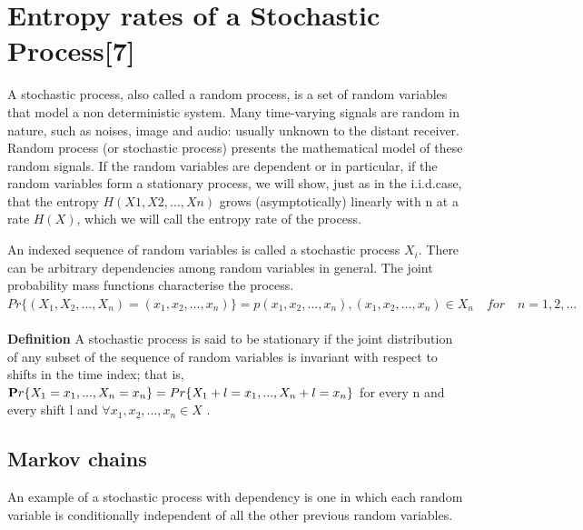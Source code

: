 \documentclass[10pt,twocolumn,letterpaper]{article}
\begin{document}
\section{Entropy rates of a Stochastic Process{\small[7]}}


A stochastic process, also called a random process, is a set of random variables that model a non deterministic system.  Many time-varying signals are random in nature, such as noises, image and audio: usually unknown to the distant receiver. Random process (or stochastic process) presents the mathematical model of these random signals. If the random variables are dependent or in particular, if the random variables form a stationary process, we will show, just as in the i.i.d.case, that the entropy
\begin{math}H (X 1 , X 2 , \dots , X n )\end{math} grows (asymptotically) linearly with n at a rate \begin{math}H ( X )\end{math}, which we will call the entropy rate of the process.

An indexed sequence of random variables is called a stochastic process
\begin{math}
{X_i}\end{math}. 
There can be arbitrary dependencies among random variables in general. The joint probability mass functions characterise the process.\\
\begin{math}
Pr\{(X_1 , X_2 , \dots , X_n )=(x_1 , x_2 , \dots, x_n )\} = p(x_1 , x_2 , \dots , x_n ), (x_1 , x_2 , \dots ,x_n ) \in X_n \quad for \quad n = 1, 2, \dots
\end{math} \\
\\
\textbf{Definition} A stochastic process is said to be stationary if the joint
distribution of any subset of the sequence of random variables is invariant
with respect to shifts in the time index; that is,\\
\begin{math}
{
\begin{mathbf}
Pr\{X_1 = x_1 , . . . , X_n = x_n \}
= Pr\{X_1+l = x_1 , . . . , X_n+l = x_n \}
\end{mathbf}
}\end{math}
for every n and every shift l and $\forall x_1 , x_2 , \dots , x_n \in X$ .
\subsection{Markov chains}
An example of a stochastic process with dependency is one in which each random variable is conditionally independent of all the other previous random variables.
\end{document}
